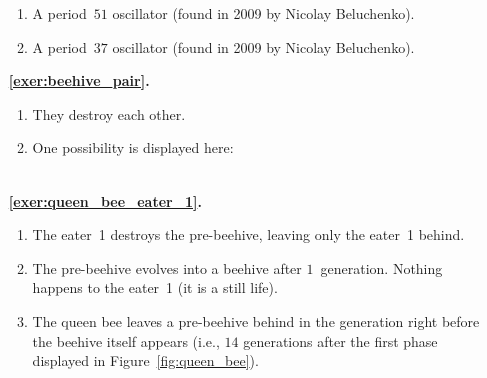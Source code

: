 \begin{multicols}{2}
\begin{itemize}[leftmargin=0em]
\begin{enumerate}[leftmargin=1.5em,label=\bf\color{ocre}(\alph*)]
			\item A period~$51$ oscillator (found in 2009 by Nicolay Beluchenko).
			
			\item A period~$37$ oscillator (found in 2009 by Nicolay Beluchenko).\\[-0.3cm]
		\end{enumerate}
	

		
		
		\item[\bf\color{ocre}\sffamily\ref{exer:beehive_pair}.] \begin{enumerate}[leftmargin=1.5em,label=\bf\color{ocre}(\alph*)]
			\item They destroy each other.
			
			\item One possibility is displayed here: \\[-0.6em]
			
			 \\
		\end{enumerate}
		
		
		\item[\bf\color{ocre}\sffamily\ref{exer:queen_bee_eater_1}.] \begin{enumerate}[leftmargin=1.5em,label=\bf\color{ocre}(\alph*)]
			\item The eater~1 destroys the pre-beehive, leaving only the eater~1 behind.
			
			\item The pre-beehive evolves into a beehive after $1$~generation. Nothing happens to the eater~1 (it is a still life).
			
			\item The queen bee leaves a pre-beehive behind in the generation right before the beehive itself appears (i.e., $14$ generations after the first phase displayed in Figure~\ref{fig:queen_bee}).
			

\end{enumerate}
\end{itemize}
\end{multicols}
